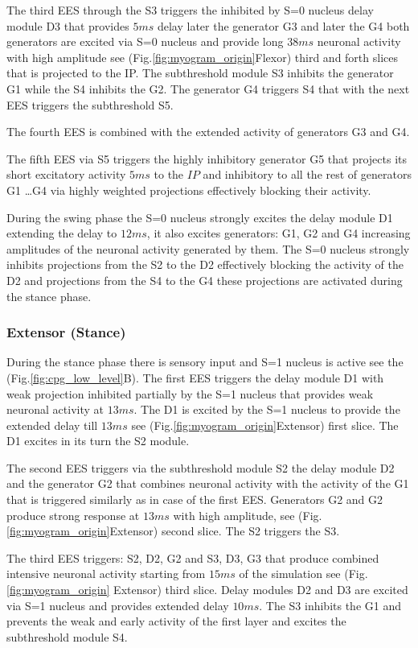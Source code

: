 \documentclass[]{elsarticle}
\begin{document}
The third EES through the S3 triggers the inhibited by S=0 nucleus delay module D3 that provides $5 ms$ delay later the generator G3 and later the G4 both generators are excited via S=0 nucleus and provide long $38 ms$ neuronal activity with high amplitude see (Fig.\ref{fig:myogram_origin}Flexor) third and forth slices that is projected to the IP.
The subthreshold module S3 inhibits the generator G1 while the S4 inhibits the G2. The generator G4 triggers S4 that with the next EES triggers the subthreshold S5.

The fourth EES is combined with the extended activity of generators G3 and G4.

The fifth EES via S5 triggers the highly inhibitory generator G5 that projects its short excitatory activity $5 ms$ to the $IP$ and inhibitory to all the rest of generators G1 \ldots G4 via highly weighted projections effectively blocking their activity.

During the swing phase the S=0 nucleus strongly excites the delay module D1 extending the delay to $12 ms$, it also excites generators: G1, G2 and G4 increasing amplitudes of the neuronal activity generated by them. The S=0 nucleus strongly inhibits projections from the S2 to the D2 effectively blocking the activity of the D2 and projections from the S4 to the G4 these projections are activated during the stance phase.

\subsubsection{Extensor (Stance)}\label{sec:extensor}

During the stance phase there is sensory input and S=1 nucleus is active see the (Fig.\ref{fig:cpg_low_level}B). The first EES triggers the delay module D1 with weak projection inhibited partially by the S=1 nucleus that provides weak neuronal activity at $13 ms$. The D1 is excited by the S=1 nucleus to provide the extended delay till $13 ms$ see (Fig.\ref{fig:myogram_origin}Extensor) first slice. The D1 excites in its turn the S2 module.

The second EES triggers via the subthreshold module S2 the delay module D2 and the generator G2 that combines neuronal activity with the activity of the G1 that is triggered similarly as in case of the first EES.
Generators G2 and G2 produce strong response at $13 ms$ with high amplitude, see (Fig.\ref{fig:myogram_origin}Extensor) second slice. The S2 triggers the S3.

The third EES triggers: S2, D2, G2 and S3, D3, G3 that produce combined intensive neuronal activity starting from $15 ms$ of the simulation see (Fig.\ref{fig:myogram_origin} Extensor) third slice. Delay modules D2 and D3 are excited via S=1 nucleus and provides extended delay $10 ms$. The S3 inhibits the G1 and prevents the weak and early activity of the first layer and excites the subthreshold module S4.
\end{document}
